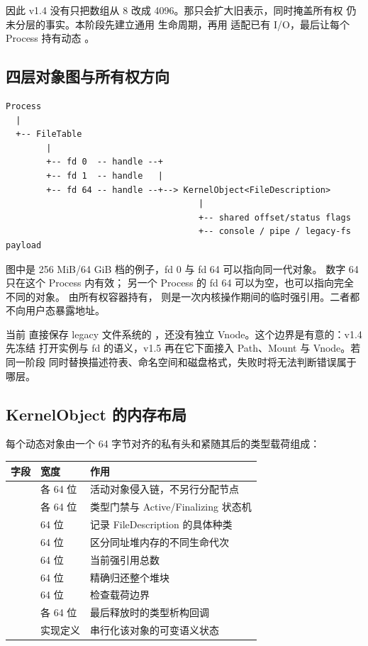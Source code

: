 因此 v1.4 没有只把数组从 8 改成 4096。那只会扩大旧表示，同时掩盖所有权
仍未分层的事实。本阶段先建立通用  生命周期，再用
 适配已有 I/O，最后让每个 Process 持有动态
。

\subsection{四层对象图与所有权方向}

\begin{lstlisting}[caption={Process、FileTable 与共享 FileDescription 的所有权图}]
Process
  |
  +-- FileTable
        |
        +-- fd 0  -- handle --+
        +-- fd 1  -- handle   |
        +-- fd 64 -- handle --+--> KernelObject<FileDescription>
                                      |
                                      +-- shared offset/status flags
                                      +-- console / pipe / legacy-fs payload
\end{lstlisting}

图中是 256 MiB/64 GiB 档的例子，fd 0 与 fd 64 可以指向同一代对象。
数字 64 只在这个 Process 内有效；
另一个 Process 的 fd 64 可以为空，也可以指向完全不同的对象。
 由所有权容器持有，
则是一次内核操作期间的临时强引用。二者都不向用户态暴露地址。

当前  直接保存 legacy 文件系统的
，还没有独立 Vnode。这个边界是有意的：v1.4 先冻结
打开实例与 fd 的语义，v1.5 再在它下面接入 Path、Mount 与 Vnode。若同一阶段
同时替换描述符表、命名空间和磁盘格式，失败时将无法判断错误属于哪层。

\subsection{KernelObject 的内存布局}

每个动态对象由一个 64 字节对齐的私有头和紧随其后的类型载荷组成：

\begin{longtable}{L{0.29\textwidth}L{0.17\textwidth}L{0.42\textwidth}}
\toprule
字段 & 宽度 & 作用\\
\midrule
{} & 各 64 位 & 活动对象侵入链，不另行分配节点\\
 & 各 64 位 & 类型门禁与 Active/Finalizing 状态机\\
 & 64 位 & 记录 FileDescription 的具体种类\\
 & 64 位 & 区分同址堆内存的不同生命代次\\
 & 64 位 & 当前强引用总数\\
 & 64 位 & 精确归还整个堆块\\
 & 64 位 & 检查载荷边界\\
 & 各 64 位 & 最后释放时的类型析构回调\\
 & 实现定义 & 串行化该对象的可变语义状态\\
\bottomrule
\end{longtable}

